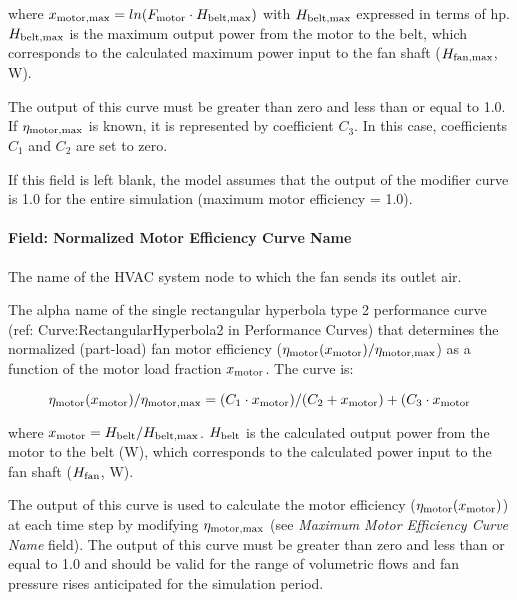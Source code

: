 where \(x_{\rm{motor, max}} = ln(F_{\rm{motor}} \cdot H_{\rm{belt, max}})\) with \(H_{\rm{belt, max}}\) expressed in terms of hp. \(H_{\rm{belt, max}}\) is the maximum output power from the motor to the belt, which corresponds to the calculated maximum power input to the fan shaft (\(H_{\rm{fan, max}}\), W).

The output of this curve must be greater than zero and less than or equal to 1.0. If \(\eta_{\rm{motor, max}}\) is known, it is represented by coefficient \(C_3\). In this case, coefficients \(C_1\) and \(C_2\) are set to zero.

If this field is left blank, the model assumes that the output of the modifier curve is 1.0 for the entire simulation (maximum motor efficiency = 1.0).

\paragraph{Field: Normalized Motor Efficiency Curve Name}\label{field-normalized-motor-efficiency-curve-name}

The name of the HVAC system node to which the fan sends its outlet air.

The alpha name of the single rectangular hyperbola type 2 performance curve (ref: Curve:RectangularHyperbola2 in Performance Curves) that determines the normalized (part-load) fan motor efficiency (\(\eta_{\rm{motor}} (x_{\rm{motor}}) /  \eta_{\rm{motor, max}}\)) as a function of the motor load fraction \(x_{\rm{motor}}\). The curve is:

\begin{equation}
  \eta_{\rm{motor}} (x_{\rm{motor}}) / \eta_{\rm{motor, max}} = (C_1 \cdot x_{\rm{motor}}) / (C_2 + x_{\rm{motor}}) + (C_3 \cdot x_{\rm{motor}}
\end{equation}

where \(x_{\rm{motor}} = H_{\rm{belt}} / H_{\rm{belt, max}}\). \(H_{\rm{belt}}\) is the calculated output power from the motor to the belt (W), which corresponds to the calculated power input to the fan shaft (\(H_{\rm{fan}}\), W).

  The output of this curve is used to calculate the motor efficiency (\(\eta_{\rm{motor}} (x_{\rm{motor}})\)) at each time step by modifying \(\eta_{\rm{motor, max}}\) (see \emph{Maximum Motor Efficiency Curve Name} field). The output of this curve must be greater than zero and less than or equal to 1.0 and should be valid for the range of volumetric flows and fan pressure rises anticipated for the simulation period.

